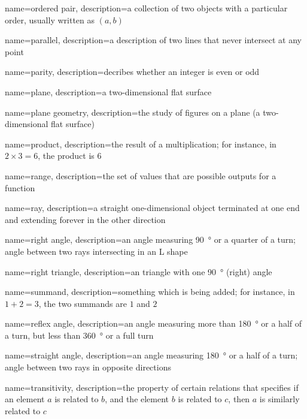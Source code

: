 {
  name=ordered pair,
  description={a collection of two objects with a particular order, usually
  written as \((a, b)\)}
}

{
  name=parallel,
  description={a description of two lines that never intersect at any point}
}

{
  name=parity,
  description={decribes whether an integer is even or odd}
}

{
  name=plane,
  description={a two-dimensional flat surface}
}

{
  name=plane geometry,
  description={the study of figures on a plane (a two-dimensional flat surface)}
}

{
  name=product,
  description={the result of a multiplication; for instance, in
  $2\times3=6$, the product is $6$}
}

{
  name=range,
  description={the set of values that are possible outputs for a function}
}

{
  name=ray,
  description={a straight one-dimensional object terminated at one end and
  extending forever in the other direction}
}

{
  name=right angle,
  description={an angle measuring \SI{90}{\degree} or a quarter of a turn; angle
  between two rays intersecting in an L shape}
}

{
  name=right triangle,
  description={an triangle with one \SI{90}{\degree} (right) angle}
}

{
  name=summand,
  description={something which is being added; for instance, in $1+2=3$,
  the two summands are $1$ and $2$}
}

{
  name=reflex angle,
  description={an angle measuring more than \SI{180}{\degree} or a half of a
  turn, but less than \SI{360}{\degree} or a full turn}
}

{
  name=straight angle,
  description={an angle measuring \SI{180}{\degree} or a half of a turn; angle
  between two rays in opposite directions}
}

{
  name=transitivity,
  description={the property of certain relations that specifies if an
  element $a$ is related to $b$, and the element $b$ is related to $c$,
  then $a$ is similarly related to $c$}
}
